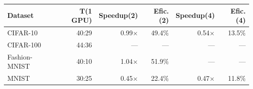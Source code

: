 \begin{tabular}{lrrrrr}
\toprule
Dataset & T(1 GPU) & Speedup(2) & Efic.(2) & Speedup(4) & Efic.(4) \\
\midrule
CIFAR-10 & 40:29 & 0.99$\times$ & 49.4\% & 0.54$\times$ & 13.5\% \\
CIFAR-100 & 44:36 & — & — & — & — \\
Fashion-MNIST & 40:10 & 1.04$\times$ & 51.9\% & — & — \\
MNIST & 30:25 & 0.45$\times$ & 22.4\% & 0.47$\times$ & 11.8\% \\
\bottomrule
\end{tabular}